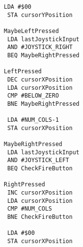 \begin{minipage}[b]{0.33\linewidth}
\begin{lrbox}{\mybox}
\begin{lstlisting}[basicstyle=\ttfamily\tiny]
 LDA #$00
 STA cursorYPosition

MaybeLeftPressed   
 LDA lastJoystickInput
 AND #JOYSTICK_RIGHT
 BEQ MaybeRightPressed

LeftPressed
 DEC cursorXPosition
 LDA cursorXPosition
 CMP #BELOW_ZERO
 BNE MaybeRightPressed

 LDA #NUM_COLS-1
 STA cursorXPosition

MaybeRightPressed   
 LDA lastJoystickInput
 AND #JOYSTICK_LEFT
 BEQ CheckFireButton

RightPressed
 INC cursorXPosition
 LDA cursorXPosition
 CMP #NUM_COLS
 BNE CheckFireButton

 LDA #$00
 STA cursorXPosition
\end{lstlisting}
\end{lrbox}%
\scalebox{0.7}{\usebox{\mybox}}
\end{minipage}
\hspace{-0.8cm}
